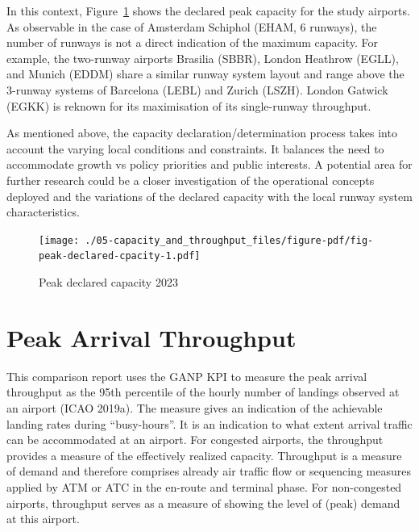 \documentclass[
  a4paper,
  DIV=11,
  numbers=noendperiod]{scrreport}
\begin{document}
In this context, Figure~\ref{fig-peak-declared-cpacity} shows the
declared peak capacity for the study airports. As observable in the case
of Amsterdam Schiphol (EHAM, 6 runways), the number of runways is not a
direct indication of the maximum capacity. For example, the two-runway
airports Brasilia (SBBR), London Heathrow (EGLL), and Munich (EDDM)
share a similar runway system layout and range above the 3-runway
systems of Barcelona (LEBL) and Zurich (LSZH). London Gatwick (EGKK) is
reknown for its maximisation of its single-runway throughput.

As mentioned above, the capacity declaration/determination process takes
into account the varying local conditions and constraints. It balances
the need to accommodate growth vs policy priorities and public
interests. A potential area for further research could be a closer
investigation of the operational concepts deployed and the variations of
the declared capacity with the local runway system characteristics.

\begin{figure}[H]

{\centering \texttt{[image: ./05-capacity\_and\_throughput\_files/figure-pdf/fig-peak-declared-cpacity-1.pdf]}

}

\caption{\label{fig-peak-declared-cpacity}Peak declared capacity 2023}

\end{figure}

\hypertarget{peak-arrival-throughput}{%
\section{Peak Arrival Throughput}\label{peak-arrival-throughput}}

This comparison report uses the GANP KPI to measure the peak arrival
throughput as the 95th percentile of the hourly number of landings
observed at an airport (ICAO 2019a). The measure gives an indication of
the achievable landing rates during ``busy-hours''. It is an indication
to what extent arrival traffic can be accommodated at an airport. For
congested airports, the throughput provides a measure of the effectively
realized capacity. Throughput is a measure of demand and therefore
comprises already air traffic flow or sequencing measures applied by ATM
or ATC in the en-route and terminal phase. For non-congested airports,
throughput serves as a measure of showing the level of (peak) demand at
this airport.
\end{document}
